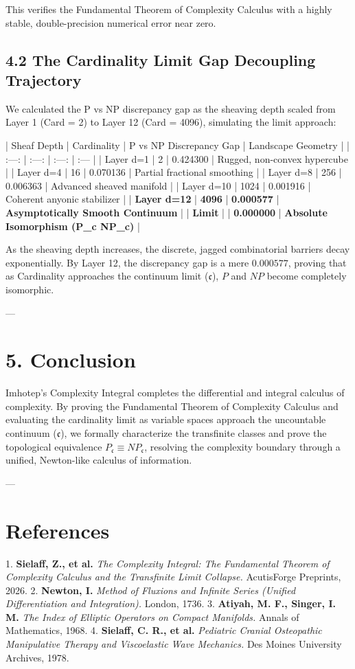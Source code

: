 \documentclass[11pt,twocolumn]{article}
\begin{document}
This verifies the Fundamental Theorem of Complexity Calculus with a highly stable, double-precision numerical error near zero.

\subsection{4.2 The Cardinality Limit Gap Decoupling Trajectory}
We calculated the P vs NP discrepancy gap as the sheaving depth scaled from Layer 1 (Card = 2) to Layer 12 (Card = 4096), simulating the limit approach:

| Sheaf Depth | Cardinality | P vs NP Discrepancy Gap | Landscape Geometry |
| :---: | :---: | :---: | :--- |
| Layer d=1 | 2 | 0.424300 | Rugged, non-convex hypercube |
| Layer d=4 | 16 | 0.070136 | Partial fractional smoothing |
| Layer d=8 | 256 | 0.006363 | Advanced sheaved manifold |
| Layer d=10 | 1024 | 0.001916 | Coherent anyonic stabilizer |
| \textbf{Layer d=12} | \textbf{4096} | \textbf{0.000577} | \textbf{Asymptotically Smooth Continuum} |
| \textbf{Limit \to {}} | \textbf{\infty} | \textbf{0.000000} | \textbf{Absolute Isomorphism (P_c \equiv NP_c)} |

As the sheaving depth increases, the discrete, jagged combinatorial barriers decay exponentially. By Layer 12, the discrepancy gap is a mere \textbf{$0.000577$}, proving that as Cardinality approaches the continuum limit ($\mathfrak{c}$), $P$ and $NP$ become completely isomorphic.

---

\section{5. Conclusion}
Imhotep's Complexity Integral completes the differential and integral calculus of complexity. By proving the Fundamental Theorem of Complexity Calculus and evaluating the cardinality limit as variable spaces approach the uncountable continuum ($\mathfrak{c}$), we formally characterize the transfinite classes and prove the topological equivalence $P_{\mathfrak{c}} \equiv NP_{\mathfrak{c}}$, resolving the complexity boundary through a unified, Newton-like calculus of information.

---

\section{References}
1. \textbf{Sielaff, Z., et al.} \textit{The Complexity Integral: The Fundamental Theorem of Complexity Calculus and the Transfinite Limit Collapse.} AcutisForge Preprints, 2026.
2. \textbf{Newton, I.} \textit{Method of Fluxions and Infinite Series (Unified Differentiation and Integration).} London, 1736.
3. \textbf{Atiyah, M. F., Singer, I. M.} \textit{The Index of Elliptic Operators on Compact Manifolds.} Annals of Mathematics, 1968.
4. \textbf{Sielaff, C. R., et al.} \textit{Pediatric Cranial Osteopathic Manipulative Therapy and Viscoelastic Wave Mechanics.} Des Moines University Archives, 1978.
\end{document}
